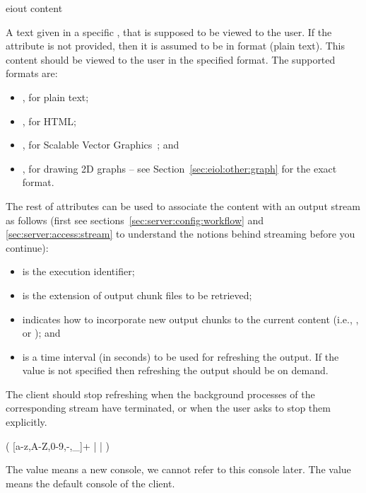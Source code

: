 \bigskip
\xmlstruct
{eiout}
{content}
{%
%
  A text  given in a specific
  , that is supposed to be viewed to the
  user. If the attribute  is not provided, then
  it is assumed to be in  format (plain text).
%
  This content should be viewed to the user in the specified
  format. The supported formats are:
%
\begin{itemize}
\item {}, for plain text;
\item {}, for HTML;
\item {}, for Scalable Vector Graphics~\cite{svg}; and
\item {}, for drawing 2D graphs -- see
  Section~\ref{sec:eiol:other:graph} for the exact
  format.
\end{itemize}
%
The rest of attributes can be used to associate the content with an
output stream as follows (first see
sections~\ref{sec:server:config:workflow} and
\ref{sec:server:access:stream} to understand the notions behind
streaming before you continue):
%
\begin{itemize}
\item {} is the execution identifier;
\item {} is the extension of output chunk files to be
  retrieved;
\item {} indicates how to incorporate new output
  chunks to the current content (i.e., ,
   or ); and
\item {} is a time interval (in seconds) to
  be used for refreshing the output. If the value is not specified
  then refreshing the output should be on demand.
\end{itemize}
%
The client should stop refreshing when the background processes of the
corresponding stream have terminated, or when the user asks to stop
them explicitly.
%
}%

\bigskip
\noindent
{}

( [a-z,A-Z,0-9,-,\_]+ |  |  )

\medskip
\noindent
The value  means a new console, we cannot refer to
this console later. The value  means the default
console of the client.


